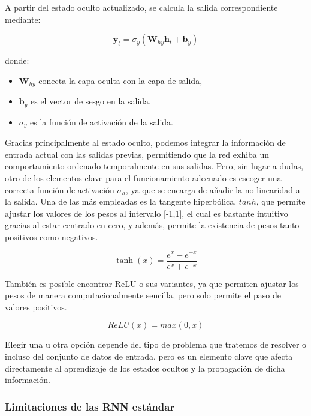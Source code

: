 A partir del estado oculto actualizado, se calcula la salida correspondiente mediante:

\begin{equation}
    \mathbf{y}_t = \sigma_y(\mathbf{W}_{hy} \mathbf{h}_t + \mathbf{b}_y)
\end{equation}

donde:
\begin{itemize}
    \item \( \mathbf{W}_{hy} \) conecta la capa oculta con la capa de salida,
    \item \( \mathbf{b}_y \) es el vector de sesgo en la salida,
    \item \textbf{\( \sigma_y \)} es la función de activación de la salida.
\end{itemize}

Gracias principalmente al estado oculto, podemos integrar la información de entrada actual con las salidas previas, permitiendo que la red exhiba un comportamiento ordenado temporalmente en sus salidas. Pero, sin lugar a dudas, otro de los elementos clave para el funcionamiento adecuado es escoger una correcta función de activación \( \sigma_h \), ya que se encarga de añadir la no linearidad a la salida. Una de las más empleadas es la tangente hiperbólica, $tanh$, que permite ajustar los valores de los pesos al intervalo [-1,1], el cual es bastante intuitivo gracias al estar centrado en cero, y además, permite la existencia de pesos tanto positivos como negativos.

\begin{equation}
    \tanh(x) = \frac{e^x - e^{-x}}{e^x + e^{-x}}
\end{equation}

También es posible encontrar ReLU o sus variantes, ya que permiten ajustar los pesos de manera computacionalmente sencilla, pero solo permite el paso de valores positivos.

\begin{equation}
    ReLU(x) = max(0, x)
    \label{eq:relu}
\end{equation}

Elegir una u otra opción depende del tipo de problema que tratemos de resolver o incluso del conjunto de datos de entrada, pero es un elemento clave que afecta directamente al aprendizaje de los estados ocultos y la propagación de dicha información.

\subsubsection{Limitaciones de las RNN estándar}

